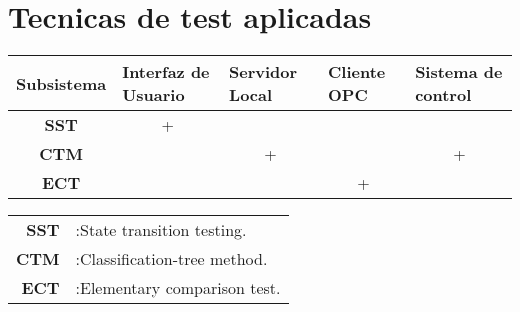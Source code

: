 \documentclass[]{scrreprt}
\begin{document}
\chapter{Tecnicas de test aplicadas}

\begin{table}[h]
\begin{tabular}{|c|c|c|c|c|}
\hline
\textbf{Subsistema}                 & \multicolumn{1}{l|}{\textbf{Interfaz de Usuario}} & \multicolumn{1}{l|}{\textbf{Servidor Local}} & \multicolumn{1}{l|}{\textbf{Cliente OPC}} & \multicolumn{1}{l|}{\textbf{Sistema de control}} \\ \hline
\textbf{SST}   & +                                                 &                                              &                                           &                                                  \\ \hline
\textbf{CTM} &                                                   & +                                            &                                           & +                                                \\ \hline
\textbf{ECT} &                                                   &                                              & +                                         &                                                  \\ \hline
\end{tabular}
\end{table}

\begin{table}[h]
\begin{tabular}{rl}
\textbf{SST} & :State transition testing. \\
\textbf{CTM}  & :Classification-tree method.      \\
\textbf{ECT}  & :Elementary comparison test.     
\end{tabular}
\end{table}
\end{document}
